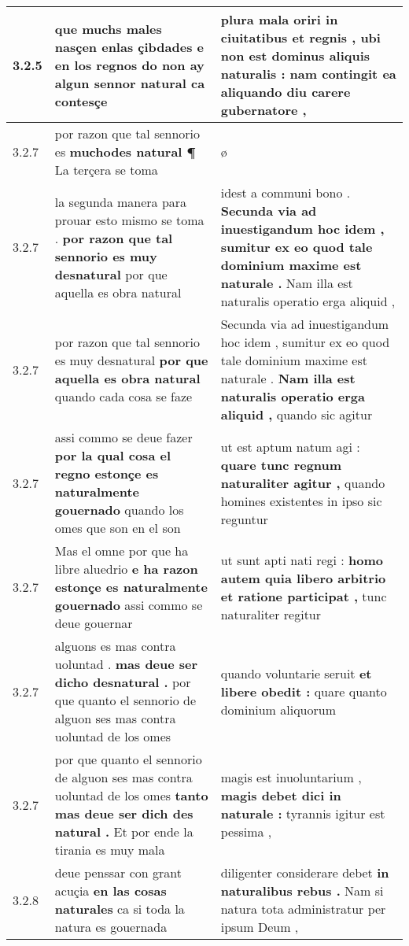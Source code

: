 \begin{tabular}{|p{1cm}|p{6.5cm}|p{6.5cm}|}
3.2.5 & que muchs males nasçen enlas çibdades \textbf{ e en los regnos do non ay algun sennor natural } ca contesçe & plura mala oriri in ciuitatibus et regnis , \textbf{ ubi non est dominus aliquis naturalis : } nam contingit ea aliquando diu carere gubernatore , \\\hline
3.2.7 & por razon que tal sennorio es \textbf{ muchodes natural ¶ } La terçera se toma & ø \\\hline
3.2.7 & la segunda manera para prouar esto mismo se toma . \textbf{ por razon que tal sennorio es muy desnatural } por que aquella es obra natural & idest a communi bono . \textbf{ Secunda via ad inuestigandum hoc idem , sumitur ex eo quod tale dominium maxime est naturale . } Nam illa est naturalis operatio erga aliquid , \\\hline
3.2.7 & por razon que tal sennorio es muy desnatural \textbf{ por que aquella es obra natural } quando cada cosa se faze & Secunda via ad inuestigandum hoc idem , sumitur ex eo quod tale dominium maxime est naturale . \textbf{ Nam illa est naturalis operatio erga aliquid , } quando sic agitur \\\hline
3.2.7 & assi commo se deue fazer \textbf{ por la qual cosa el regno estonçe es naturalmente gouernado } quando los omes que son en el son & ut est aptum natum agi : \textbf{ quare tunc regnum naturaliter agitur , } quando homines existentes in ipso sic reguntur \\\hline
3.2.7 & Mas el omne por que ha libre aluedrio \textbf{ e ha razon estonçe es naturalmente gouernado } assi commo se deue gouernar & ut sunt apti nati regi : \textbf{ homo autem quia libero arbitrio et ratione participat , } tunc naturaliter regitur \\\hline
3.2.7 & alguons es mas contra uoluntad . \textbf{ mas deue ser dicho desnatural . } por que quanto el sennorio de alguon ses mas contra uoluntad de los omes & quando voluntarie seruit \textbf{ et libere obedit : } quare quanto dominium aliquorum \\\hline
3.2.7 & por que quanto el sennorio de alguon ses mas contra uoluntad de los omes \textbf{ tanto mas deue ser dich des natural . } Et por ende la tirania es muy mala & magis est inuoluntarium , \textbf{ magis debet dici in naturale : } tyrannis igitur est pessima , \\\hline
3.2.8 & deue penssar con grant acuçia \textbf{ en las cosas naturales } ca si toda la natura es gouernada & diligenter considerare debet \textbf{ in naturalibus rebus . } Nam si natura tota administratur per ipsum Deum , \\\hline

\end{tabular}
